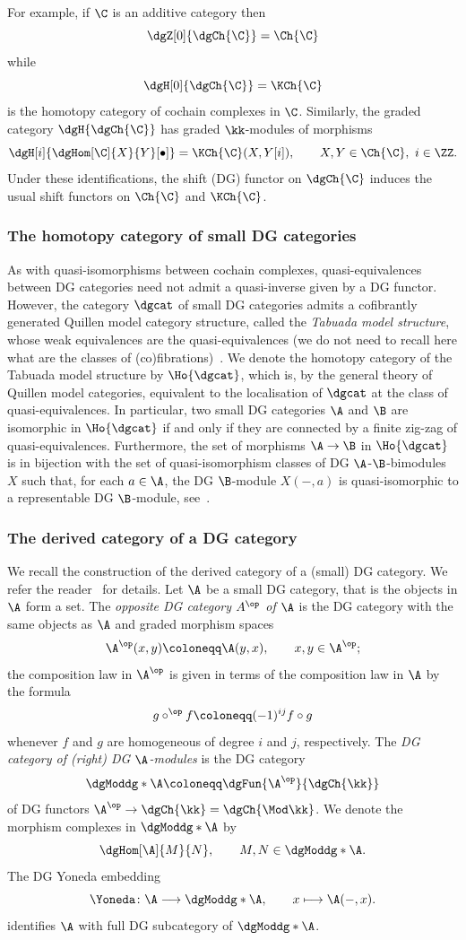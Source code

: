 \documentclass[a4paper]{amsart}
\begin{document}
For example, if $\C$ is an additive category then
\[
  \dgZ[0]{\dgCh{\C}}=\Ch{\C}
\]
while
\[
  \dgH[0]{\dgCh{\C}}=\KCh{\C}
\]
is the homotopy category of cochain complexes in $\C$. Similarly, the graded
category $\dgH{\dgCh{\C}}$ has graded $\kk$-modules of morphisms
\[
  \dgH[i]{\dgHom[\C]{X}{Y}[\bullet]}=\KCh{\C}(X,Y[i]),\qquad X,Y\in\Ch{\C},\
  i\in\ZZ.
\]
Under these identifications, the shift (DG) functor on $\dgCh{\C}$ induces the
usual shift functors on $\Ch{\C}$ and $\KCh{\C}$.

\subsubsection{The homotopy category of small DG categories }
\label{subsubsec:hocat}

As with quasi-isomorphisms between cochain complexes, quasi-equivalences between
DG categories need not admit a quasi-inverse given by a DG functor. However, the
category $\dgcat$ of small DG categories admits a cofibrantly generated Quillen
model category structure, called the \emph{Tabuada model structure}, whose weak
equivalences are the quasi-equivalences (we do not need to recall here what are
the classes of (co)fibrations)~\cite{Tab05}. We denote the homotopy category of
the Tabuada model structure by $\Ho{\dgcat}$, which is, by the general theory of
Quillen model categories, equivalent to the localisation of $\dgcat$ at the
class of quasi-equivalences. In particular, two small DG categories $\A$ and
$\B$ are isomorphic in $\Ho{\dgcat}$ if and only if they are connected by a
finite zig-zag of quasi-equivalences. Furthermore, the set of morphisms
$\A\to\B$ in $\Ho{\dgcat}$ is in bijection with the set of quasi-isomorphism
classes of DG $\A$-$\B$-bimodules $X$ such that, for each $a\in\A$, the DG
$\B$-module $X(-,a)$ is quasi-isomorphic to a representable DG $\B$-module,
see~\cite[Cor.~4.8]{Toe11}.

\subsubsection{The derived category of a DG category}

We recall the construction of the derived category of a (small) DG category. We
refer the reader~\cite{Kel94} for details. Let $\A$ be a small DG category, that
is the objects in $\A$ form a set. The \emph{opposite DG category $A^\op$ of
  $\A$} is the DG category with the same objects as $\A$ and graded morphism
spaces
\[
  \A^\op(x,y)\coloneqq\A(y,x),\qquad x,y\in\A^\op;
\]
the composition law in $\A^\op$ is given in terms of the composition law in $\A$
by the formula
\[
  g\circ^\op f\coloneqq (-1)^{ij}f\circ g
\]
whenever $f$ and $g$ are homogeneous of degree $i$ and $j$, respectively.
The \emph{DG category of (right) DG
  $\A$-modules} is the DG category
\[
  \dgModdg*{\A}\coloneqq\dgFun{\A^\op}{\dgCh{\kk}}
\]
of DG functors $\A^\op\to\dgCh{\kk}=\dgCh{\Mod\kk}$. We denote the morphism complexes in
$\dgModdg*{\A}$ by
\[
  \dgHom[\A]{M}{N},\qquad M,N\in\dgModdg*{\A}.
\]
The DG Yoneda embedding
\[
  \Yoneda\colon\A\longrightarrow\dgModdg*{\A},\qquad x\longmapsto\A(-,x).
\]
identifies $\A$ with full DG subcategory of $\dgModdg*{\A}$.
\end{document}
